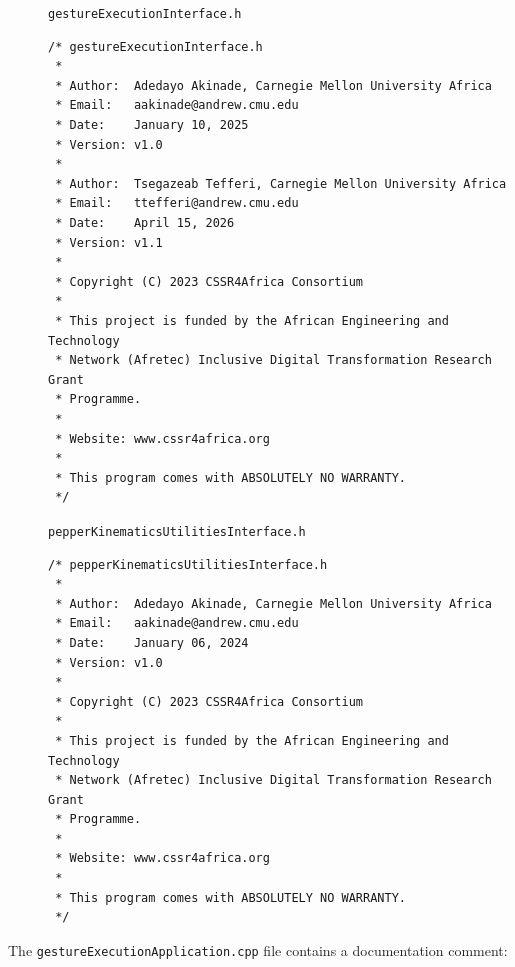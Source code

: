 \documentclass{CSSRforAfrica}
\newcommand{\blank}{~\\}
\newcommand{\checkboxChecked}{\fbox{\ding{51}}} %
\begin{document}
\begin{description}
\item[\checkboxChecked] {\small \verb+gestureExecutionInterface.h+}   
{\small \begin{verbatim}
/* gestureExecutionInterface.h
 *
 * Author:  Adedayo Akinade, Carnegie Mellon University Africa
 * Email:   aakinade@andrew.cmu.edu
 * Date:    January 10, 2025
 * Version: v1.0
 *
 * Author:  Tsegazeab Tefferi, Carnegie Mellon University Africa
 * Email:   ttefferi@andrew.cmu.edu
 * Date:    April 15, 2026
 * Version: v1.1
 *
 * Copyright (C) 2023 CSSR4Africa Consortium
 *
 * This project is funded by the African Engineering and Technology
 * Network (Afretec) Inclusive Digital Transformation Research Grant
 * Programme.
 *
 * Website: www.cssr4africa.org
 *
 * This program comes with ABSOLUTELY NO WARRANTY.
 */
\end{verbatim} }

\item[\checkboxChecked] {\small \verb+pepperKinematicsUtilitiesInterface.h+}   
{\small \begin{verbatim}
/* pepperKinematicsUtilitiesInterface.h
 *
 * Author:  Adedayo Akinade, Carnegie Mellon University Africa
 * Email:   aakinade@andrew.cmu.edu
 * Date:    January 06, 2024
 * Version: v1.0
 *
 * Copyright (C) 2023 CSSR4Africa Consortium
 *
 * This project is funded by the African Engineering and Technology
 * Network (Afretec) Inclusive Digital Transformation Research Grant
 * Programme.
 *
 * Website: www.cssr4africa.org
 *
 * This program comes with ABSOLUTELY NO WARRANTY.
 */
\end{verbatim} }

\end{description} 
%
\noindent The {\small \verb+gestureExecutionApplication.cpp+} file contains a documentation comment:
\end{document}

